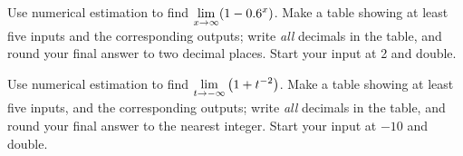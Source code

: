 \documentclass[notes]{subfiles}
\begin{document}
 		\begin{ex}
 			Use numerical estimation to find $\displaystyle\lim_{x\to \infty} (1-0.6^x)$.  Make a table showing at least five inputs and the corresponding outputs; write \emph{all} decimals in the table, and round your final answer to two decimal places.  Start your input at 2 and double.
 		\end{ex}
 			
 		\begin{ex}
 			Use numerical estimation to find $\displaystyle \lim_{t\to -\infty} \left( 1+t^{-2}\right)$.  Make a table showing at least five inputs, and the corresponding outputs; write \emph{all} decimals in the table, and round your final answer to the nearest integer.  Start your input at $-10$ and double.
 		\end{ex}
 		\clearpage
\end{document}

